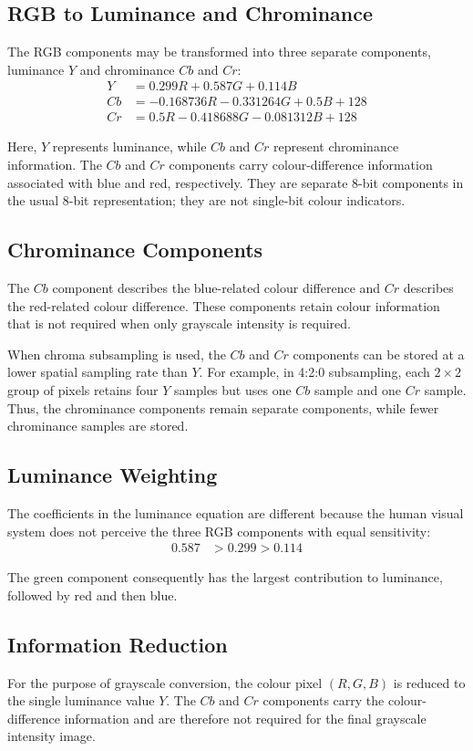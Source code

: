 \subsection{RGB to Luminance and Chrominance}

The RGB components may be transformed into three separate components,
luminance $Y$ and chrominance $Cb$ and $Cr$:
\begin{align}
Y  &= 0.299R + 0.587G + 0.114B\label{eq:y_luminance}\\
Cb &= -0.168736R - 0.331264G + 0.5B + 128\label{eq:cb_chrominance}\\
Cr &= 0.5R - 0.418688G - 0.081312B + 128\label{eq:cr_chrominance}
\end{align}

Here, $Y$ represents luminance, while $Cb$ and $Cr$ represent
chrominance information. The $Cb$ and $Cr$ components carry colour-difference
information associated with blue and red, respectively. They are separate
8-bit components in the usual 8-bit representation; they are not single-bit
colour indicators.
\vspace*{\baselineskip}
\subsection{Chrominance Components}

The $Cb$ component describes the blue-related colour difference and
$Cr$ describes the red-related colour difference. These components
retain colour information that is not required when only grayscale
intensity is required.

When chroma subsampling is used, the $Cb$ and $Cr$ components can be
stored at a lower spatial sampling rate than $Y$. For example, in 4:2:0
subsampling, each $2\times2$ group of pixels retains four $Y$ samples but
uses one $Cb$ sample and one $Cr$ sample. Thus, the chrominance components
remain separate components, while fewer chrominance samples are stored.
\vspace*{\baselineskip}
\subsection{Luminance Weighting}

The coefficients in the luminance equation are different because the
human visual system does not perceive the three RGB components with
 equal sensitivity:
\begin{align}
0.587&>0.299>0.114\label{eq:luminance_weights}
\end{align}

The green component consequently has the largest contribution to
luminance, followed by red and then blue.
\vspace*{\baselineskip}
\subsection{Information Reduction}

For the purpose of grayscale conversion, the colour pixel $(R,G,B)$ is
reduced to the single luminance value $Y$. The $Cb$ and $Cr$ components
carry the colour-difference information and are therefore not required
for the final grayscale intensity image.
